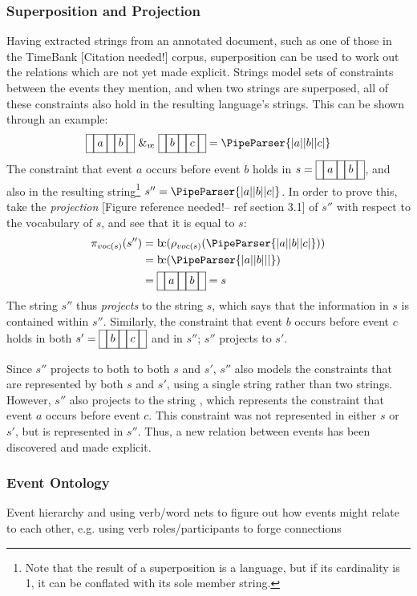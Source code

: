 \documentclass[a4paper,12pt,leqno]{article}
\newcommand{\bc}{{\rm b\!c}}
\newcommand{\vph}[1]{\vphantom{#1}}
\newcommand{\ebox}[1]{\fbox{$\vph{'(),}#1$}}
\newcommand{\nbBefore}[2]{\ebox{#1}\ebox{}\ebox{#2}}
\newcommand{\Before}[2]{\ebox{}\nbBefore{#1}{#2}\ebox{}}
\newcommand{\spvc}{~\&_{v\!c}~}
\newcommand{\EventString}[1]{%
	\renewcommand*{\do}[1]{\ebox{##1}}%
	\PipeParser{#1}%
}
\newcommand{\refneeded}[1][]{{\color{red}[Figure reference needed!#1]}}
\newcommand{\citeneeded}[1][]{{\color{red}[Citation needed!#1]}}
\begin{document}
\subsubsection{Superposition and Projection}\label{ssub:superposition}
Having extracted strings from an annotated document, such as one of those in the TimeBank \citeneeded{} corpus, superposition can be used to work out the relations which are not yet made explicit. Strings model sets of constraints between the events they mention, and when two strings are superposed, all of these constraints also hold in the resulting language's strings. This can be shown through an example:
\begin{align}
\Before{a}{b} \spvc \Before{b}{c} = \EventString{{}|a|{}|b|{}|c|{}}
\end{align}
The constraint that event $a$ occurs before event $b$ holds in $s = \Before{a}{b}$, and also in the resulting string\footnote{Note that the result of a superposition is a language, but if its cardinality is 1, it can be conflated with its sole member string.} $s'' = \EventString{{}|a|{}|b|{}|c|{}}$. In order to prove this, take the \textit{projection} \refneeded[-- ref section 3.1]{} of $s''$ with respect to the vocabulary of $s$, and see that it is equal to $s$:
\begin{align}
\pi_{voc(s)}(s'') &= \bc(\rho_{voc(s)}(\EventString{{}|a|{}|b|{}|c|{}}))\\ \notag
				  &= \bc(\EventString{{}|a|{}|b|{}|{}|{}})\\ \notag
				  &= \Before{a}{b} = s
\end{align}
The string $s''$ thus \textit{projects} to the string $s$, which says that the information in $s$ is contained within $s''$. Similarly, the constraint that event $b$ occurs before event $c$ holds in both $s' = \Before{b}{c}$ and in $s''$; $s''$ projects to $s'$.

Since $s''$ projects to both to both $s$ and $s'$, $s''$ also models the constraints that are represented by both $s$ and $s'$, using a single string rather than two strings. However, $s''$ also projects to the string \Before{a}{c}, which represents the constraint that event $a$ occurs before event $c$. This constraint was not represented in either $s$ or $s'$, but is represented in $s''$. Thus, a new relation between events has been discovered and made explicit. 

\subsubsection{Event Ontology}\label{ssub:ontology}
Event hierarchy and using verb/word nets to figure out how events might relate to each other, e.g. using verb roles/participants to forge connections
\end{document}
